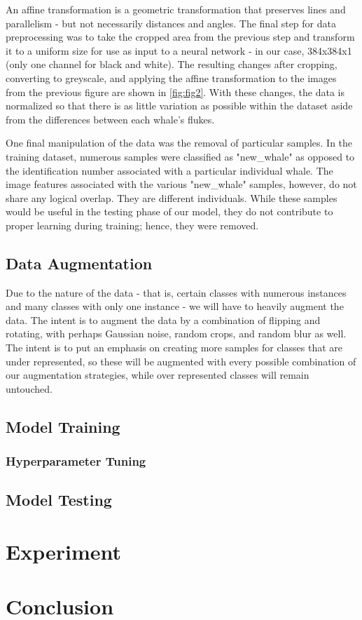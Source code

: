 \documentclass[paper=a4, fontsize=11pt]{scrartcl}
\numberwithin{equation}{section}		%
\numberwithin{table}{section}				%
\begin{document}
An affine transformation is a geometric transformation that preserves lines and parallelism - but not necessarily distances and angles. The final step for data preprocessing was to take the cropped area from the previous step and transform it to a uniform size for use as input to a neural network - in our case, 384x384x1 (only one channel for black and white). The resulting changes after cropping, converting to greyscale, and applying the affine transformation to the images from the previous figure are shown in \autoref{fig:fig2}. With these changes, the data is normalized so that there is as little variation as possible within the dataset aside from the differences between each whale's flukes.

One final manipulation of the data was the removal of particular samples. In the training dataset, numerous samples were classified as "new\_whale" as opposed to the identification number associated with a particular individual whale. The image features associated with the various "new\_whale" samples, however, do not share any logical overlap. They are different individuals. While these samples would be useful in the testing phase of our model, they do not contribute to proper learning during training; hence, they were removed.

\subsection{Data Augmentation}\label{subsec:Augmentation}
Due to the nature of the data - that is, certain classes with numerous instances and many classes with only one instance - we will have to heavily augment the data. The intent is to augment the data by a combination of flipping and rotating, with perhaps Gaussian noise, random crops, and random blur as well. The intent is to put an emphasis on creating more samples for classes that are under represented, so these will be augmented with every possible combination of our augmentation strategies, while over represented classes will remain untouched. 

\subsection{Model Training}

\subsubsection{Hyperparameter Tuning}

\subsection{Model Testing}

\section{Experiment}\label{sec: experiment}

\section{Conclusion}\label{sec: conlusion}

 
\clearpage
 




\end{document}
